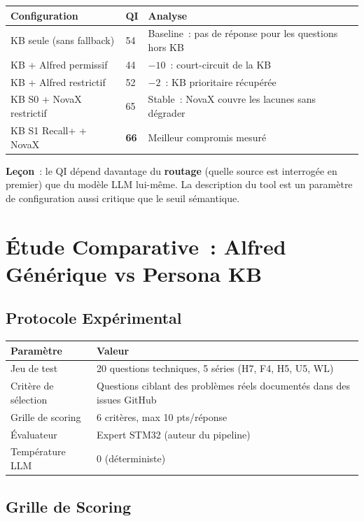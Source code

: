\begin{longtable}{p{4.5cm}p{2cm}p{6.5cm}}
\toprule
\textbf{Configuration} & \textbf{QI} & \textbf{Analyse} \\
\midrule
KB seule (sans fallback) & 54 & Baseline~: pas de réponse pour les questions hors KB \\
KB + Alfred permissif & 44 & $-10$~: court-circuit de la KB \\
KB + Alfred restrictif & 52 & $-2$~: KB prioritaire récupérée \\
KB S0 + NovaX restrictif & 65 & Stable~: NovaX couvre les lacunes sans dégrader \\
KB S1 Recall+ + NovaX & \textbf{66} & Meilleur compromis mesuré \\
\bottomrule
\end{longtable}

\textbf{Leçon}~: le QI dépend davantage du \textbf{routage} (quelle source est interrogée en premier) que du modèle LLM lui-même. La description du tool est un paramètre de configuration aussi critique que le seuil sémantique.

\section{Étude Comparative~: Alfred Générique vs Persona KB}
\label{sec:etude_comparative}

\subsection{Protocole Expérimental}

\begin{longtable}{p{4cm}p{9cm}}
\toprule
\textbf{Paramètre} & \textbf{Valeur} \\
\midrule
Jeu de test & 20 questions techniques, 5 séries (H7, F4, H5, U5, WL) \\
Critère de sélection & Questions ciblant des problèmes réels documentés dans des issues GitHub \\
Grille de scoring & 6 critères, max 10 pts/réponse \\
Évaluateur & Expert STM32 (auteur du pipeline) \\
Température LLM & 0 (déterministe) \\
\bottomrule
\end{longtable}

\subsection{Grille de Scoring}

